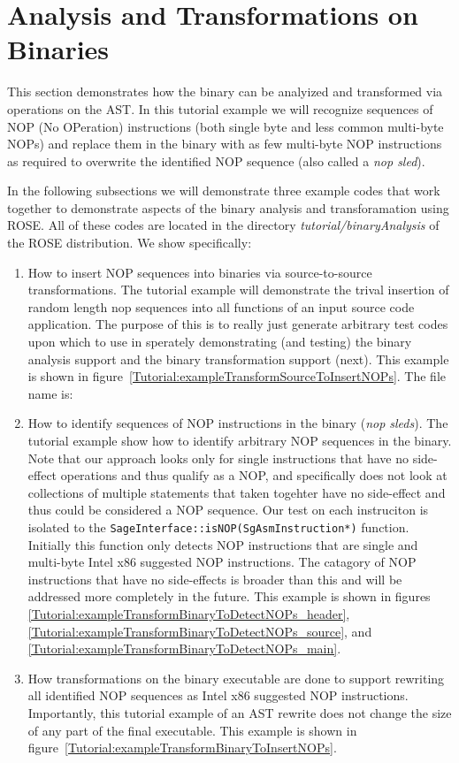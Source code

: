  
\section{Analysis and Transformations on Binaries}

   This section demonstrates how the binary can be analyized and
transformed via operations on the AST. In this tutorial example we will
recognize sequences of NOP (No OPeration) instructions (both single byte
and less common multi-byte NOPs) and replace them in the binary with as 
few multi-byte NOP instructions as required to overwrite the identified
NOP sequence (also called a {\em nop sled}).

In the following subsections we will demonstrate three example codes that
work together to demonstrate aspects of the binary analysis and transforamation using
ROSE.  All of these codes are located in the directory {\em tutorial/binaryAnalysis}
of the ROSE distribution. We show specifically:
\begin{enumerate}
   \item How to insert NOP sequences into binaries via source-to-source transformations.
         The tutorial example will demonstrate the trival insertion of random length
         nop sequences into all functions of an input source code application.
         The purpose of this is to really just generate arbitrary test codes
         upon which to use in sperately demonstrating (and testing) the binary analysis 
         support and the binary transformation support (next).  This example is
         shown in figure~\ref{Tutorial:exampleTransformSourceToInsertNOPs}.
         The file name is: 
   \item How to identify sequences of NOP instructions in the binary ({\em nop sleds}).
         The tutorial example show how to identify arbitrary NOP sequences in the 
         binary.  Note that our approach looks only for single instructions that have
         no side-effect operations and thus qualify as a NOP, and specifically does not
         look at collections of multiple statements that taken togehter have no
         side-effect and thus could be considered a NOP sequence. Our test on each 
         instruciton is isolated to the {\tt SageInterface::isNOP(SgAsmInstruction*)} 
         function.  Initially this function only detects NOP instructions that are
         single and multi-byte Intel x86 suggested NOP instructions.  The catagory of
         NOP instructions that have no side-effects is broader than this and will
         be addressed more completely in the future. This example is
         shown in figures \ref{Tutorial:exampleTransformBinaryToDetectNOPs_header},
         \ref{Tutorial:exampleTransformBinaryToDetectNOPs_source}, and
         \ref{Tutorial:exampleTransformBinaryToDetectNOPs_main}.
   \item How transformations on the binary executable are done to support rewriting
         all identified NOP sequences as Intel x86 suggested NOP instructions.
         Importantly, this tutorial example of an AST rewrite does not change the 
         size of any part of the final executable. This example is
         shown in figure~\ref{Tutorial:exampleTransformBinaryToInsertNOPs}.
\end{enumerate}

